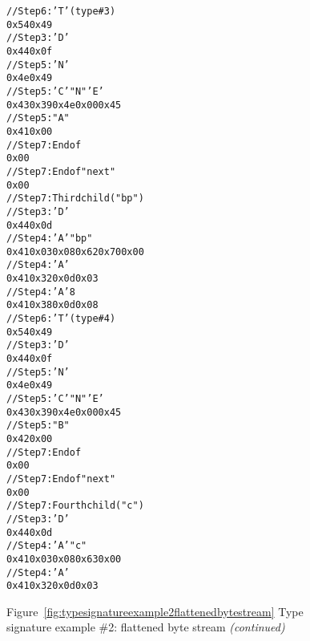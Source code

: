 \begin{figure}
\begin{dwflisting}
\begin{alltt}    
    // Step 6: 'T'  (type \#3)
    0x54 0x49
        // Step 3: 'D' 
        0x44 0x0f
        // Step 5: 'N' 
        0x4e 0x49
        // Step 5: 'C'  "N" 'E'
        0x43 0x39 0x4e 0x00 0x45
        // Step 5: "A"
        0x41 0x00
        // Step 7: End of 
        0x00
    // Step 7: End of  "next"
    0x00
// Step 7: Third child ("bp")
    // Step 3: 'D' 
    0x44 0x0d
    // Step 4: 'A'   "bp"
    0x41 0x03 0x08 0x62 0x70 0x00
    // Step 4: 'A'   
    0x41 0x32 0x0d 0x03
    // Step 4: 'A'   8
    0x41 0x38 0x0d 0x08
    // Step 6: 'T'  (type \#4)
    0x54 0x49
        // Step 3: 'D' 
0x44 0x0f
        // Step 5: 'N' 
        0x4e 0x49
        // Step 5: 'C'  "N" 'E'
        0x43 0x39 0x4e 0x00 0x45
        // Step 5: "B"
        0x42 0x00
        // Step 7: End of 
        0x00
    // Step 7: End of  "next"
    0x00
// Step 7: Fourth child ("c")
    // Step 3: 'D' 
    0x44 0x0d
    // Step 4: 'A'   "c"
    0x41 0x03 0x08 0x63 0x00
    // Step 4: 'A'   
    0x41 0x32 0x0d 0x03
\end{alltt}
\end{dwflisting}
\begin{center}
Figure~\ref{fig:typesignatureexample2flattenedbytestream} Type signature example \#2: flattened byte stream \textit{(continued)}
\end{center}
\end{figure}
    
